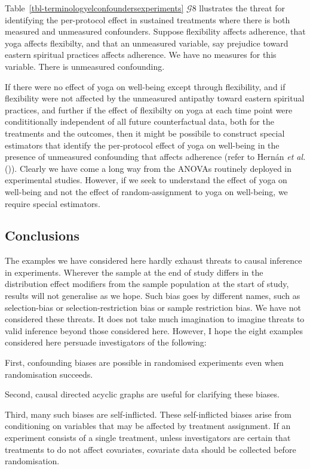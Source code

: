 \documentclass[
  single column]{article}
\begin{document}
Table~\ref{tbl-terminologyelconfoundersexperiments} \(\mathcal{G} 8\)
llustrates the threat for identifying the per-protocol effect in
sustained treatments where there is both measured and unmeasured
confounders. Suppose flexibility affects adherence, that yoga affects
flexibilty, and that an unmeasured variable, say prejudice toward
eastern spiritual practices affects adherence. We have no measures for
this variable. There is unmeasured confounding.

If there were no effect of yoga on well-being except through
flexibility, and if flexibility were not affected by the unmeasured
antipathy toward eastern spiritual practices, and further if the effect
of flexibilty on yoga at each time point were condititionally
independent of all future counterfactual data, both for the treatments
and the outcomes, then it might be possibile to construct special
estimators that identify the per-protocol effect of yoga on well-being
in the presence of unmeasured confounding that affects adherence (refer
to Hernán \emph{et al.} ()). Clearly
we have come a long way from the ANOVAs routinely deployed in
experimental studies. However, if we seek to understand the effect of
yoga on well-being and not the effect of random-assignment to yoga on
well-being, we require special estimators.

\subsection{Conclusions}\label{conclusions}

The examples we have considered here hardly exhaust threats to causal
inference in experiments. Wherever the sample at the end of study
differs in the distribution effect modifiers from the sample population
at the start of study, results will not generalise as we hope. Such bias
goes by different names, such as selection-bias or selection-restriction
bias or sample restriction bias. We have not considered these threats.
It does not take much imagination to imagine threats to valid inference
beyond those considered here. However, I hope the eight examples
considered here persuade investigators of the following:

First, confounding biases are possible in randomised experiments even
when randomisation succeeds.

Second, causal directed acyclic graphs are useful for clarifying these
biases.

Third, many such biases are self-inflicted. These self-inflicted biases
arise from conditioning on variables that may be affected by treatment
assignment. If an experiment consists of a single treatment, unless
investigators are certain that treatments to do not affect covariates,
covariate data should be collected before randomisation.
\end{document}
